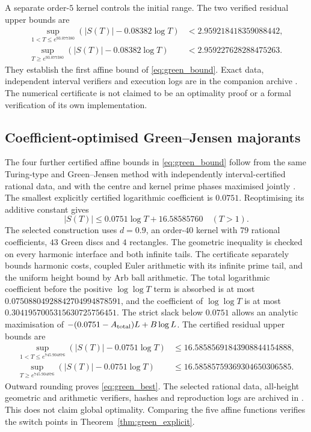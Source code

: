 \documentclass[11pt,reqno]{amsart}
\makeatletter
\let\CG@origcite\cite
\renewcommand*{\cite}[2][]{\def\CG@citekey{#2}%
  \ifx\relax#1\relax\CG@origcite{#2}\else\CG@origcite[#1]{#2}\fi}
\numberwithin{equation}{section}
\theoremstyle{definition}
\theoremstyle{remark}
\makeatother
\begin{document}
A separate order-$5$ kernel controls the initial range.
The two verified residual upper bounds are
\begin{equation}
\begin{aligned}
\sup_{1<T\le e^{93.077380}}
(|S(T)|-0.08382\log T)&<2.959218418359088442,\\
\sup_{T\ge e^{93.077380}}
(|S(T)|-0.08382\log T)&<2.959227628288475263.
\end{aligned}
\label{eq:green_bounds}
\end{equation}
They establish the first affine bound of
\eqref{eq:green_bound}.
Exact data, independent interval verifiers and execution logs
are in the companion archive \cite{CasanaCertificate2026}.
The numerical certificate is not claimed to be an optimality
proof or a formal verification of its own implementation.



\subsection{Coefficient-optimised Green--Jensen majorants}
The four further certified affine bounds in
\eqref{eq:green_bound} follow from the same
Turing-type and Green--Jensen method with
independently interval-certified rational data,
and with the centre and kernel prime phases
maximised jointly \cite{CasanaSlopeCertificate2026}.
The smallest explicitly certified logarithmic
coefficient is $0.0751$. Reoptimising its
additive constant gives
\begin{equation}
|S(T)|\le0.0751\log T+16.58585760\quad(T>1).
\label{eq:green_best}
\end{equation}
The selected construction uses $d=0.9$,
an order-$40$ kernel with $79$ rational
coefficients, $43$ Green discs and $4$
rectangles. The geometric inequality is
checked on every harmonic interface and
both infinite tails. The certificate separately
bounds harmonic costs, coupled Euler arithmetic
with its infinite prime tail, and the uniform
height bound by Arb ball arithmetic.
The total logarithmic coefficient before the
positive $\log\log T$ term is absorbed is at most
$0.07508804928842704994878591$, and the
coefficient of $\log\log T$ is at most
$0.3041957005315630725756451$.
The strict slack below $0.0751$ allows an
analytic maximisation of
$-(0.0751-A_{\rm total})L+B\log L$.
The certified residual upper bounds are
\begin{equation}
\begin{aligned}
\sup_{1<T\le e^{745.904876}}
(|S(T)|-0.0751\log T)
&\le16.58585691843908844154888,\\
\sup_{T\ge e^{745.904876}}
(|S(T)|-0.0751\log T)
&\le16.58585759369304650306585.
\end{aligned}
\label{eq:green_best_branches}
\end{equation}
Outward rounding proves \eqref{eq:green_best}.
The selected rational data, all-height geometric
and arithmetic verifiers, hashes and reproduction
logs are archived in \cite{CasanaA0751Certificate2026}.
This does not claim global optimality.
Comparing the five affine functions verifies
the switch points in Theorem~\ref{thm:green_explicit}.
\end{document}
